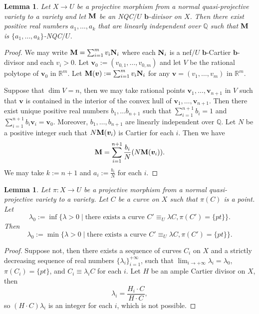 \documentclass[11pt]{amsart}
\numberwithin{equation}{section}
\newcommand{\bb}{\bm{b}}
\newcommand{\Mm}{{\bf{M}}}
\newcommand{\Nn}{{\bf{N}}}
\newtheorem{lem}[thm]{Lemma}
\theoremstyle{definition}
\theoremstyle{definition}
\theoremstyle{definition}
\begin{document}
\begin{lem}\label{lem: nqc good decomposition}
    Let $X\rightarrow U$ be a projective morphism from a normal quasi-projective variety to a variety and let $\Mm$ be an NQC$/U$ $\bb$-divisor on $X$. Then there exist positive real numbers $a_1,\dots,a_k$ that are linearly independent over $\mathbb Q$ such that $\Mm$ is $\{a_1,\dots,a_k\}$-NQC$/U$.
\end{lem}
\begin{proof}
    We may write $\Mm=\sum_{i=1}^mv_i\Nn_i$ where each $\Nn_i$ is a nef$/U$ $\bb$-Cartier $\bb$-divisor and each $v_i>0$. Let $\bm{v}_0:=(v_{0,1},\dots,v_{0,m})$ and let $V$ be the rational polytope of $\bm{v}_0$ in $\mathbb R^m$. Let $\Mm(\bm{v}):=\sum_{i=1}^mv_i\Nn_i$ for any $\bm{v}=(v_1,\dots,v_m)$ in $\mathbb R^m$. 
    
    Suppose that $\dim V=n$, then we may take rational points $\bm{v}_1,\dots,\bm{v}_{n+1}$ in $V$ such that $\bm{v}$ is contained in the interior of the convex hull of $\bm{v}_1,\dots,\bm{v}_{n+1}$. Then there exist unique positive real numbers $b_1,\dots b_{n+1}$ such that $\sum_{i=1}^{n+1}b_i=1$ and $\sum_{i=1}^{n+1}b_i\bm{v}_i=\bm{v}_0$. Moreover, $b_1,\dots,b_{n+1}$ are linearly independent over $\mathbb Q$. Let $N$ be a positive integer such that $N\Mm(\bm{v}_i)$ is Cartier for each $i$. Then we have
    $$\Mm=\sum_{i=1}^{n+1}\frac{b_i}{N}(N\Mm(\bm{v}_i)).$$
    We may take $k:=n+1$ and $a_i:=\frac{b_i}{N}$ for each $i$. 
\end{proof}

\begin{lem}\label{lem: inf=min length}
    Let $\pi: X\rightarrow U$ be a projective morphism from a normal quasi-projective variety to a variety. Let $C$ be a curve on $X$ such that $\pi(C)$ is a point. Let
    $$\lambda_0:=\inf\{\lambda>0\mid \text{there exists a curve }C'\equiv_U\lambda C, \pi(C')=\{pt\}\}.$$
    Then
    $$\lambda_0:=\min\{\lambda>0\mid \text{there exists a curve }C'\equiv_U\lambda C, \pi(C')=\{pt\}\}.$$
\end{lem}
\begin{proof}
    Suppose not, then there exists a sequence of curves $C_i$ on $X$ and a strictly decreasing sequence of real numbers $\{\lambda_i\}_{i=1}^{+\infty}$, such that $\lim_{i\rightarrow+\infty}\lambda_i=\lambda_0$, $\pi(C_i)=\{pt\}$, and $C_i\equiv\lambda_iC$ for each $i$. Let $H$ be an ample Cartier divisor on $X$, then 
    $$\lambda_i=\frac{H_i\cdot C}{H\cdot C},$$
    so $(H\cdot C)\lambda_i$ is an integer for each $i$, which is not possible.
\end{proof}
\end{document}
